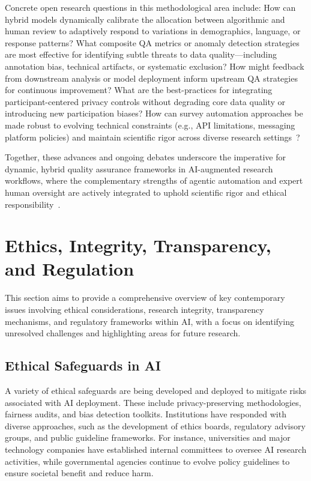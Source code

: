 \documentclass[sigconf]{acmart}
\begin{document}
Concrete open research questions in this methodological area include: How can hybrid models dynamically calibrate the allocation between algorithmic and human review to adaptively respond to variations in demographics, language, or response patterns? What composite QA metrics or anomaly detection strategies are most effective for identifying subtle threats to data quality—including annotation bias, technical artifacts, or systematic exclusion? How might feedback from downstream analysis or model deployment inform upstream QA strategies for continuous improvement? What are the best-practices for integrating participant-centered privacy controls without degrading core data quality or introducing new participation biases? How can survey automation approaches be made robust to evolving technical constraints (e.g., API limitations, messaging platform policies) and maintain scientific rigor across diverse research settings~\cite{ref117}?

Together, these advances and ongoing debates underscore the imperative for dynamic, hybrid quality assurance frameworks in AI-augmented research workflows, where the complementary strengths of agentic automation and expert human oversight are actively integrated to uphold scientific rigor and ethical responsibility~\cite{ref88,ref89,ref91,ref92,ref93,ref96,ref97,ref98,ref108,ref112,ref113,ref114,ref115,ref117}.

\section{Ethics, Integrity, Transparency, and Regulation}

This section aims to provide a comprehensive overview of key contemporary issues involving ethical considerations, research integrity, transparency mechanisms, and regulatory frameworks within AI, with a focus on identifying unresolved challenges and highlighting areas for future research.

\subsection{Ethical Safeguards in AI}

A variety of ethical safeguards are being developed and deployed to mitigate risks associated with AI deployment. These include privacy-preserving methodologies, fairness audits, and bias detection toolkits. Institutions have responded with diverse approaches, such as the development of ethics boards, regulatory advisory groups, and public guideline frameworks. For instance, universities and major technology companies have established internal committees to oversee AI research activities, while governmental agencies continue to evolve policy guidelines to ensure societal benefit and reduce harm.
\end{document}
